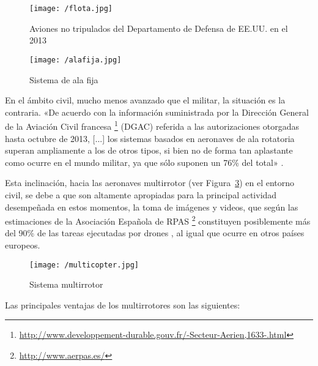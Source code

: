 \begin{figure}[!h]
\begin{center}
\texttt{[image: /flota.jpg]}
\caption[Aviones no tripulados del Departamento de Defensa de EE.UU. en el 2013]{Aviones no tripulados del Departamento de Defensa de EE.UU. en el 2013 \cite{ambitocivil2}}
\label{fig:flota}
\end{center}
\end{figure}


\begin{figure}[!h]
\begin{center}
\texttt{[image: /alafija.jpg]}
\caption[Sistema de ala fija]{Sistema de ala fija}
\label{fig:alafija}
\end{center}
\end{figure}

En el ámbito civil, mucho menos avanzado que el militar, la situación es la contraria. «De acuerdo con la información suministrada por la Dirección General de la Aviación Civil francesa \footnote{\url{http://www.developpement-durable.gouv.fr/-Secteur-Aerien,1633-.html}} (DGAC) referida a las autorizaciones otorgadas hasta octubre de 2013, [...] los sistemas basados en aeronaves de ala rotatoria superan ampliamente
a los de otros tipos, si bien no de forma tan aplastante como ocurre en el mundo militar, ya que sólo suponen un 76\% del total» \cite{dron2}.

Esta inclinación, hacia las aeronaves multirrotor (ver Figura~\ref{fig:multirrotor}) en el entorno civil, se debe a que son altamente apropiadas para la principal actividad desempeñada en estos momentos, la toma de imágenes y videos, que según las estimaciones de la Asociación Española de RPAS \footnote{\url{http://www.aerpas.es/}} constituyen posiblemente más del 90\% de las tareas ejecutadas por drones \cite{AERPAS}, al igual que ocurre en otros países europeos.

\begin{figure}[!h]
\begin{center}
\texttt{[image: /multicopter.jpg]}
\caption[Sistema multirrotor]{Sistema multirrotor}
\label{fig:multirrotor}
\end{center}
\end{figure}

Las principales ventajas de los multirrotores son las siguientes:

